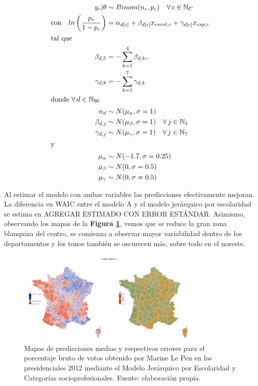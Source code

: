 \begin{align}\label{eq:Modelo_Comp_A}
y_c|\theta & \sim Binom(n_c,p_c) \quad \forall \, c \in \mathbb{N}_C \nonumber \\
\text{con} \quad ln\left(\dfrac{p_c}{1-p_c}\right) &= \alpha_{d[c]} + \beta_{d[c]} x_{escol,c} + \gamma_{d[c]} x_{csp,c} \\ 
\intertext{tal que} 
\beta_{d,5} &= -\sum\limits_{k = 1}^{4} \beta_{d,k}, \nonumber \\
\gamma_{d,8} &= -\sum\limits_{k = 1}^{7} \gamma_{d,k} \nonumber \\
\intertext{donde $\forall \, d \in \mathbb{N}_{96}$}
\alpha_d & \sim N(\mu_{\alpha}, \sigma=1) \quad  \nonumber \\
\beta_{d,j} & \sim N(\mu_{\beta}, \sigma=1) \quad \forall \, j \in \mathbb{N}_{4} \nonumber \\
\gamma_{d,j} & \sim N(\mu_{\gamma}, \sigma=1) \quad \forall \, j \in \mathbb{N}_{7} \nonumber \\
\intertext{y}
\mu_{\alpha} &\sim N(-1.7,\sigma=0.25) \nonumber \\
\mu_{\beta} &\sim N(0,\sigma=0.5) \nonumber \\
\mu_{\gamma} &\sim N(0,\sigma=0.5) \nonumber
\end{align}

Al estimar el modelo con ambas variables las predicciones efectivamente mejoran. La diferencia en WAIC entre el modelo A y el modelo jerárquico por escolaridad se estima en {\color{Red} AGREGAR ESTIMADO CON ERROR ESTÁNDAR}. Asimismo, observando los mapas de la \textbf{Figura \ref{fig:Modelo_Compuesto_A}}, vemos que se reduce la gran zona blanquiza del centro, se comienza a observar mayor variabilidad dentro de los departamentos y los tonos también se oscurecen más, sobre todo en el noreste.\\ 

\begin{figure}[h]
	\centering
	\includegraphics[width = 0.8\textwidth]{Figs/Modelado/Modelo_Compuesto_A}
	\caption{Mapas de predicciones medias y respectivos errores para el porcentaje bruto de votos obtenido por Marine Le Pen en las presidenciales 2012 mediante el Modelo Jerárquico por Escolaridad y Categorías socioprofesionales. Fuente: elaboración propia.}
	\label{fig:Modelo_Compuesto_A}
\end{figure}


